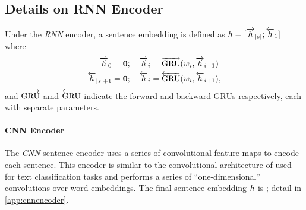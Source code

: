 \begin{toappendix}
\section{Details on RNN Encoder} \label{app:rnnencoder}
  
Under the \textit{RNN} encoder, a sentence embedding is defined as
$\sentEmb = [\rSentEmb[\sentSize]; \lSentEmb[1]]$
where 
\begin{align} 
  \rSentEmb[0] = \mathbf{0} &;\quad 
       \rSentEmb[i] = \rgru(\wordEmb[i], \rSentEmb[i-1]) \\
  \lSentEmb[\sentSize + 1] = \mathbf{0} &;\quad 
       \lSentEmb[i] = \lgru(\wordEmb[i], \lSentEmb[i+1]),
\end{align}
and $\overrightarrow{\operatorname{GRU}}$ amd $\overleftarrow{\operatorname{GRU}}$ indicate the 
forward and backward GRUs respectively, each with separate 
parameters.
\end{toappendix}


\paragraph{CNN Encoder} The \textit{CNN} sentence encoder uses a series of 
convolutional feature maps to encode each sentence. This encoder is similar
to the convolutional architecture of \cite{kim2014convolutional} used for text
classification
tasks and performs a series of ``one-dimensional'' convolutions over 
word embeddings. The final sentence embedding $\sentEmb$ is ; detail in \autoref{app:cnnencoder}.

